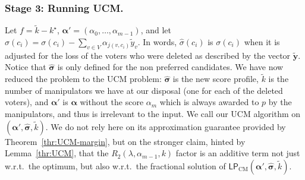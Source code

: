 \documentclass[letterpaper]{article} %
\theoremstyle{definition}
\newcommand\vecc{\mathbf}
\newcommand\vecgreek{\bm}
\newcommand{\veca}{\vecgreek{\alpha}}
\newcommand{\LPCM}{\mathsf{LP}_{\mathrm{CM}}}
\begin{document}
\subsubsection{Stage 3: Running UCM.}
Let $f=\tilde{k}-k^\star$, $\veca'=(\alpha_{0},\ldots,\alpha_{m-1})$, and let  $\hat{\sigma}(c_i)=\sigma(c_i) - \sum_{v \in V}\alpha_{j(v,c_i)} \tilde{y}_{v}$. In words, $\hat{\sigma}(c_i)$ is $\sigma(c_i)$ when it is adjusted for the loss of the voters who were deleted as described by the vector $\tilde{\vecc{y}}$. Notice that $\hat{\vecgreek{\sigma}}$ is only defined for the non preferred candidates. We have now reduced the problem to the UCM problem: $\hat{\vecgreek{\sigma}}$ is the new score profile,  $\tilde{k}$ is the number of manipulators we have at our disposal (one for each of the deleted voters), and $\veca'$ is $\veca$ without the score $\alpha_m$ which is always awarded to $p$ by the manipulators, and thus is irrelevant to the input. We call our UCM algorithm on $(\veca', \hat{\vecgreek{\sigma}}, \tilde{k})$. We do not rely here on its approximation guarantee provided by Theorem~\ref{thr:UCM-margin}, but on the stronger claim, hinted by Lemma~\ref{thr:UCM}, that the $R_2(\lambda, \alpha_{m-1},k)$ factor is an additive term not just w.r.t.\ the optimum, but also w.r.t.\ the fractional solution of $\LPCM(\veca', \vecgreek{\hat{\sigma}}, \tilde{k})$.
\end{document}
